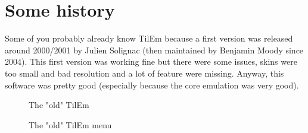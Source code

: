 \documentclass[10pt]{report}
\begin{document}
\section{Some history}
Some of you probably already know TilEm because a first version was released around 2000/2001 by Julien Solignac (then maintained by Benjamin Moody since 2004).\newline
This first version was working fine but there were some issues, skins were too small and bad resolution and a lot of feature were missing.\newline
Anyway, this software was pretty good (especially because the core emulation was very good).\newline

\begin{figure}[H]
\centering
{}
\caption{The "old" TilEm}
\end{figure}

\begin{figure}[H]
\centering
{}
\caption{The "old" TilEm menu}
\end{figure}
\end{document}
